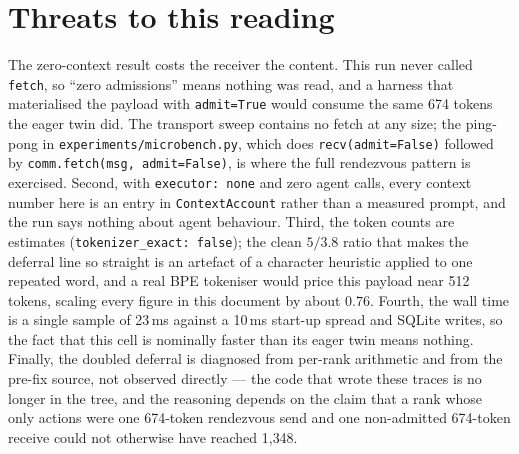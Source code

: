\documentclass[11pt]{article}
\begin{document}
\section{Threats to this reading}

The zero-context result costs the receiver the content. This run never called
\texttt{fetch}, so ``zero admissions'' means nothing was read, and a harness that
materialised the payload with \texttt{admit=True} would consume the same 674 tokens
the eager twin did. The transport sweep contains no fetch at any size; the ping-pong
in \texttt{experiments/microbench.py}, which does \texttt{recv(admit=False)} followed
by \texttt{comm.fetch(msg, admit=False)}, is where the full rendezvous pattern is
exercised. Second, with \texttt{executor: none} and zero agent calls, every context
number here is an entry in \texttt{ContextAccount} rather than a measured prompt, and
the run says nothing about agent behaviour. Third, the token counts are estimates
(\texttt{tokenizer\_exact: false}); the clean $5/3.8$ ratio that makes the deferral
line so straight is an artefact of a character heuristic applied to one repeated
word, and a real BPE tokeniser would price this payload near 512 tokens, scaling
every figure in this document by about $0.76$. Fourth, the wall time is a single
sample of 23\,ms against a 10\,ms start-up spread and SQLite writes, so the fact that
this cell is nominally faster than its eager twin means nothing. Finally, the doubled
deferral is diagnosed from per-rank arithmetic and from the pre-fix source, not
observed directly --- the code that wrote these traces is no longer in the tree, and
the reasoning depends on the claim that a rank whose only actions were one 674-token
rendezvous send and one non-admitted 674-token receive could not otherwise have
reached 1{,}348.
\end{document}
